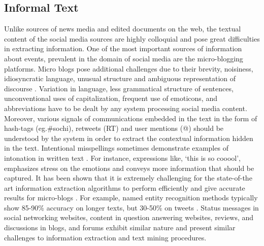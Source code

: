 \subsection{Informal Text}
Unlike sources of news media and edited documents on the web, the textual content of the social media sources are highly colloquial and pose great difficulties in extracting information. One of the most important sources of information about events, prevalent in the domain of social media are the micro-blogging platforms. Micro blogs pose additional challenges due to their brevity, noisiness, idiosyncratic language, unusual structure and ambiguous representation of discourse \cite{bontcheva2013twitie}. Variation in language, less grammatical structure of sentences, unconventional uses of capitalization, frequent use of emoticons, and abbreviations have to be dealt by any system processing social media content. Moreover, various signals of communications embedded in the text in the form of hash-tags (eg.\#sochi), retweets (RT) and user mentions (@) should be understood by the system in order to extract the contextual information hidden in the text. Intentional misspellings sometimes demonstrate examples of intonation in written text \cite{prevost1996information}. For instance, expressions like, `this is so cooool', emphasizes stress on the emotions and conveys more information that should be captured. It has been shown that it is extremely challenging for the state-of-the art information extraction algorithms to perform efficiently and give accurate results for micro-blogs \cite{derczynski2013microblog}. For example, named entity recognition methods typically show 85-90\% accuracy on longer texts, but 30-50\% on tweets \cite{ritter2011named}. Status messages in social networking websites, content in question answering websites, reviews, and discussions in blogs, and forums exhibit similar nature and present similar challenges to information extraction and text mining procedures.



